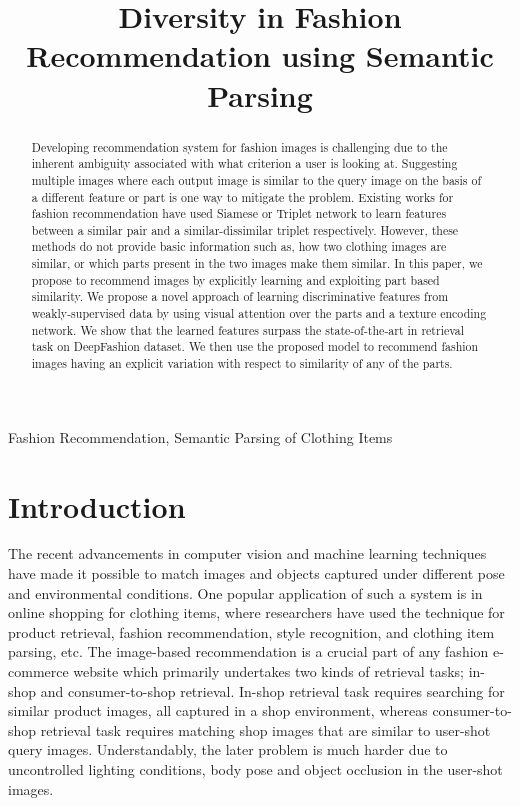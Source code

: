\documentclass{article}
\title{Diversity in Fashion Recommendation using Semantic Parsing}
\begin{document}
%
\maketitle
%
\begin{abstract}
Developing recommendation system for fashion images is challenging due to the inherent ambiguity associated with what criterion a user is looking at. Suggesting multiple images where each output image is similar to the query image on the basis of a different feature or part is one way to mitigate the problem. Existing works for fashion recommendation have used Siamese or Triplet network to learn features between a similar pair and a similar-dissimilar triplet respectively. However, these methods do not provide basic information such as, how two clothing images are similar, or which parts present in the two images make them similar. In this paper, we propose to recommend images by explicitly learning and exploiting part based similarity. We propose a novel approach of learning discriminative features from weakly-supervised data by using visual attention over the parts and a texture encoding network. We show that the learned features surpass the state-of-the-art in retrieval task on DeepFashion dataset. We then use the proposed model to recommend fashion images having an explicit variation with respect to similarity of any of the parts.
\end{abstract}

\begin{keywords}
Fashion Recommendation, Semantic Parsing of Clothing Items
\end{keywords}

\section{Introduction}
\label{sec:intro}

The recent advancements in computer vision and machine learning techniques have made it possible to match images and objects captured under different pose and environmental conditions. One popular application of such a system is in online shopping for clothing items, where researchers have used the technique for product retrieval, fashion recommendation, style recognition, and clothing item parsing, etc. The image-based recommendation is a crucial part of any fashion e-commerce website which primarily undertakes two kinds of retrieval tasks; in-shop and consumer-to-shop retrieval. In-shop retrieval task requires searching for similar product images, all captured in a shop environment, whereas consumer-to-shop retrieval task requires matching shop images that are similar to user-shot query images. Understandably, the later problem is much harder due to uncontrolled lighting conditions, body pose and object occlusion in the user-shot images.
\end{document}
